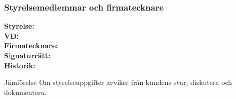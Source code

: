 \documentclass[10pt]{beamer}
\begin{document}
\begin{frame}[label=styrelse]
  \frametitle{Styrelsemedlemmar och firmatecknare}
  \small
  \textbf{Styrelse:} \underline{\hspace{8cm}} \\
  \textbf{VD:} \underline{\hspace{8cm}} \\
  \textbf{Firmatecknare:} \underline{\hspace{8cm}} \\
  \textbf{Signaturrätt:} \underline{\hspace{8cm}} \\
  \textbf{Historik:} \underline{\hspace{8cm}} \\
  \vspace{0.5cm}
  \begin{block}{Jämförelse}
    Om styrelseuppgifter avviker från kundens svar, diskutera och dokumentera.
  \end{block}
  \vspace{0.8cm}
  \begin{flushright}
    \hyperlink{nextslide}{}
  \end{flushright}
\end{frame}
\end{document}
